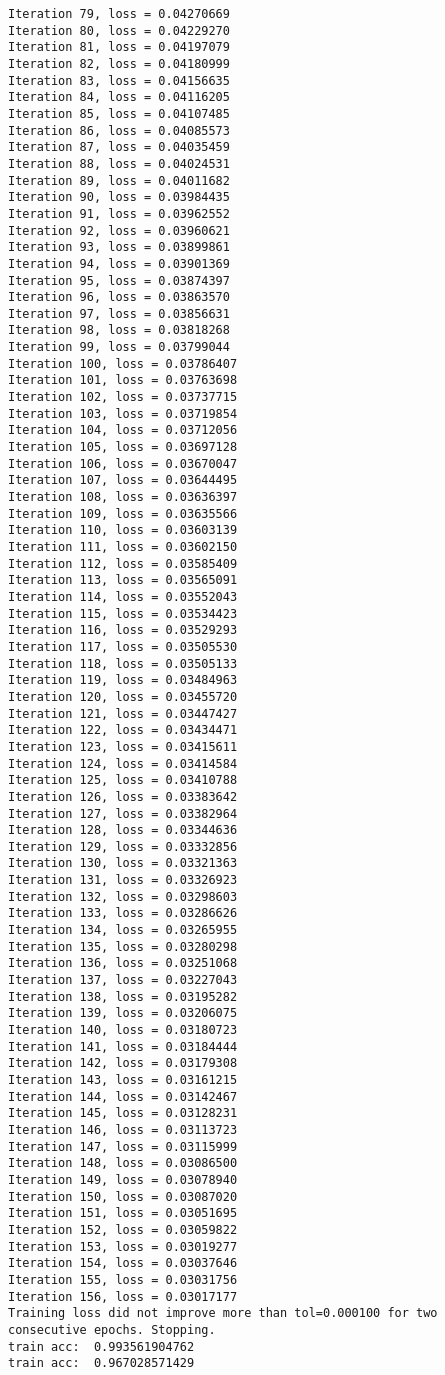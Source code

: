 \documentclass[11pt]{article}
\begin{document}
\begin{Verbatim}[commandchars=\\\{\}]
Iteration 79, loss = 0.04270669
Iteration 80, loss = 0.04229270
Iteration 81, loss = 0.04197079
Iteration 82, loss = 0.04180999
Iteration 83, loss = 0.04156635
Iteration 84, loss = 0.04116205
Iteration 85, loss = 0.04107485
Iteration 86, loss = 0.04085573
Iteration 87, loss = 0.04035459
Iteration 88, loss = 0.04024531
Iteration 89, loss = 0.04011682
Iteration 90, loss = 0.03984435
Iteration 91, loss = 0.03962552
Iteration 92, loss = 0.03960621
Iteration 93, loss = 0.03899861
Iteration 94, loss = 0.03901369
Iteration 95, loss = 0.03874397
Iteration 96, loss = 0.03863570
Iteration 97, loss = 0.03856631
Iteration 98, loss = 0.03818268
Iteration 99, loss = 0.03799044
Iteration 100, loss = 0.03786407
Iteration 101, loss = 0.03763698
Iteration 102, loss = 0.03737715
Iteration 103, loss = 0.03719854
Iteration 104, loss = 0.03712056
Iteration 105, loss = 0.03697128
Iteration 106, loss = 0.03670047
Iteration 107, loss = 0.03644495
Iteration 108, loss = 0.03636397
Iteration 109, loss = 0.03635566
Iteration 110, loss = 0.03603139
Iteration 111, loss = 0.03602150
Iteration 112, loss = 0.03585409
Iteration 113, loss = 0.03565091
Iteration 114, loss = 0.03552043
Iteration 115, loss = 0.03534423
Iteration 116, loss = 0.03529293
Iteration 117, loss = 0.03505530
Iteration 118, loss = 0.03505133
Iteration 119, loss = 0.03484963
Iteration 120, loss = 0.03455720
Iteration 121, loss = 0.03447427
Iteration 122, loss = 0.03434471
Iteration 123, loss = 0.03415611
Iteration 124, loss = 0.03414584
Iteration 125, loss = 0.03410788
Iteration 126, loss = 0.03383642
Iteration 127, loss = 0.03382964
Iteration 128, loss = 0.03344636
Iteration 129, loss = 0.03332856
Iteration 130, loss = 0.03321363
Iteration 131, loss = 0.03326923
Iteration 132, loss = 0.03298603
Iteration 133, loss = 0.03286626
Iteration 134, loss = 0.03265955
Iteration 135, loss = 0.03280298
Iteration 136, loss = 0.03251068
Iteration 137, loss = 0.03227043
Iteration 138, loss = 0.03195282
Iteration 139, loss = 0.03206075
Iteration 140, loss = 0.03180723
Iteration 141, loss = 0.03184444
Iteration 142, loss = 0.03179308
Iteration 143, loss = 0.03161215
Iteration 144, loss = 0.03142467
Iteration 145, loss = 0.03128231
Iteration 146, loss = 0.03113723
Iteration 147, loss = 0.03115999
Iteration 148, loss = 0.03086500
Iteration 149, loss = 0.03078940
Iteration 150, loss = 0.03087020
Iteration 151, loss = 0.03051695
Iteration 152, loss = 0.03059822
Iteration 153, loss = 0.03019277
Iteration 154, loss = 0.03037646
Iteration 155, loss = 0.03031756
Iteration 156, loss = 0.03017177
Training loss did not improve more than tol=0.000100 for two consecutive epochs. Stopping.
train acc:  0.993561904762
train acc:  0.967028571429

    \end{Verbatim}
\end{document}
